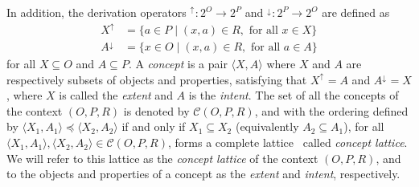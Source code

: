 \documentclass[runningheads,a4paper]{llncs}
\newcommand{\calC}{\mathcal C}
\newcommand{\up}[1][]{{^{\uparrow_{#1}}}}
\newcommand{\down}[1][]{{^{\downarrow^{#1}}}}
\newcommand{\cred}[1]{{\color{red} #1}}
\newcommand{\cb}[1]{{\color{blue}#1}}
\begin{document}
In addition, the derivation operators $\up \colon 2^O \to 2^P$ and $\down \colon 2^P \to 2^O$ are defined as
\begin{align*}
	X\up &= \{a \in P \mid (x, a) \in R, \text{ for all $x \in X$}\} \\
	A\down &= \{x \in O \mid (x, a) \in R, \text{ for all $a \in A$}\}
\end{align*}
for all $X \subseteq O$ and $A \subseteq P$.
A \emph{concept} is a pair $\langle X, A \rangle$ \cred{where $X$ and $A$ are respectively subsets of objects and properties,}
satisfying that $X\up = A$ and $A\down = X$, \cb{where $X$ is called the \emph{extent} and $A$ is the \emph{intent}}. The set of all the concepts of the context $(O, P, R)$ is denoted by $\calC(O, P, R)$, and with the ordering defined by $\langle X_1, A_1 \rangle \preceq \langle X_2, A_2 \rangle$ if and only if $X_1 \subseteq X_2$ (equivalently $A_2 \subseteq A_1$), for all $\langle X_1, A_1 \rangle, \langle X_2, A_2 \rangle \in \calC(O, P, R)$, forms a complete lattice~\cite{DaveyPriestley} \cb{called  \emph{concept lattice}}. \cred{We will refer to this lattice as the \emph{concept lattice} of the context $(O, P, R)$, and to the objects and properties of a concept as the \emph{extent} and \emph{intent}, respectively.}


	



	
\end{document}
